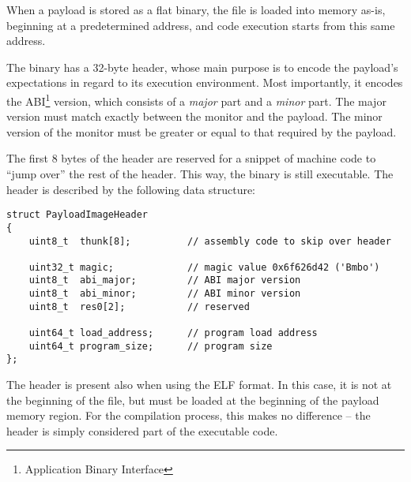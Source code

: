 When a payload is stored as a flat binary, the file is loaded into memory as-is, beginning at a predetermined address, and code execution starts from this same address.

The binary has a 32-byte header, whose main purpose is to encode the payload's expectations in regard to its execution environment. Most importantly, it encodes the ABI\footnote{Application Binary Interface} version, which consists of a \textit{major} part and a \textit{minor} part. The major version must match exactly between the monitor and the payload. The minor version of the monitor must be greater or equal to that required by the payload.

The first 8 bytes of the header are reserved for a snippet of machine code to ``jump over'' the rest of the header. This way, the binary is still executable. The header is described by the following data structure:

\begin{verbatim}
struct PayloadImageHeader
{
    uint8_t  thunk[8];          // assembly code to skip over header

    uint32_t magic;             // magic value 0x6f626d42 ('Bmbo')
    uint8_t  abi_major;         // ABI major version
    uint8_t  abi_minor;         // ABI minor version
    uint8_t  res0[2];           // reserved

    uint64_t load_address;      // program load address
    uint64_t program_size;      // program size
};
\end{verbatim}

The header is present also when using the ELF format. In this case, it is not at the beginning of the file, but must be loaded at the beginning of the payload memory region. For the compilation process, this makes no difference -- the header is simply considered part of the executable code.
